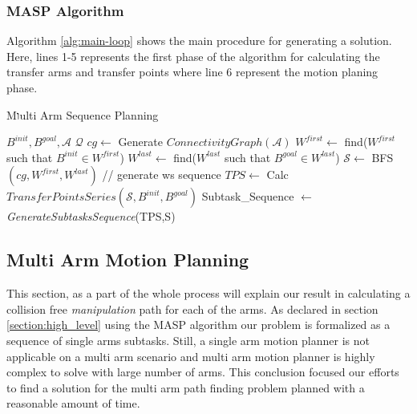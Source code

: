\documentclass[english]{article}
\theoremstyle{definition}
\begin{document}
\subsubsection*{MASP Algorithm}
Algorithm \ref{alg:main-loop} shows the main procedure for generating a solution. Here, lines 1-5 represents the first phase of the algorithm for calculating the transfer arms and transfer points where line 6 represent the motion planing phase. 

\begin{algorithm}
\caption{Mוulti Arm Sequence Planning} \label{alg:main-loop}
\begin{algorithmic}  [1] %
\Require $B^{init},B^{goal},\mathcal{A}$
\Ensure $\mathcal{Q}$
\State $cg\leftarrow$ Generate $ConnectivityGraph\left(\mathcal{A}\right)$
\State $W^{first}\leftarrow $ find($W^{first}$ such that $B^{init}\in W^{first}$)
\State $W^{last}\leftarrow $ find($W^{last}$ such that $B^{goal}\in W^{last}$)
\State $\mathcal{S}\leftarrow$ BFS$( cg,W^{first},W^{last})$ // generate ws sequence
\State $TPS\leftarrow$ Calc $TransferPointsSeries\left(\mathcal{S},B^{init},B^{goal}\right)$
\State Subtask\_Sequence $\leftarrow$ \textit{GenerateSubtasksSequence}(TPS,S)

\end{algorithmic}
\end{algorithm}


\subsection{Multi Arm Motion Planning}
This section, as a part of the whole process will explain our result in calculating a collision free \textit{manipulation} path for each of the arms. As declared in section \ref{section:high_level} using the MASP algorithm our problem is formalized as a sequence of single arms subtasks. Still, a single arm motion planner is not applicable on a multi arm scenario and multi arm motion planner is highly complex to solve with large number of arms. This conclusion focused our efforts to find a solution for the multi arm path finding problem planned with a reasonable amount of time. 
\end{document}
